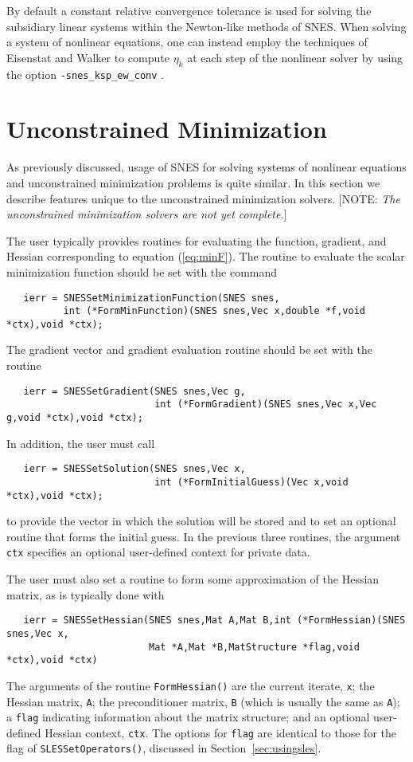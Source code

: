 By default a constant relative convergence tolerance is used for
solving the subsidiary linear systems within the Newton-like methods
of SNES.  When solving a system of nonlinear equations, one can
instead employ the techniques of Eisenstat and Walker \cite{ew94} to
compute $\eta_k$ at each step of the nonlinear solver by using the
option {\tt -snes\_ksp\_ew\_conv} .
 
\section{Unconstrained Minimization}
\label{sec:sums}

As previously discussed, usage of SNES for solving systems of nonlinear
equations and unconstrained minimization problems is quite similar.  In
this section we describe features unique to the unconstrained minimization
solvers. [NOTE:  {\em The unconstrained minimization solvers are not yet 
complete.}]

The user typically provides routines for evaluating the function,
gradient, and Hessian corresponding to equation (\ref{eq:minF}).  The
routine to evaluate the scalar minimization function should be set
with the command
\begin{verbatim}
   ierr = SNESSetMinimizationFunction(SNES snes,
          int (*FormMinFunction)(SNES snes,Vec x,double *f,void *ctx),void *ctx);
\end{verbatim}
The gradient vector and gradient evaluation routine should be set with
the routine
\begin{verbatim}
   ierr = SNESSetGradient(SNES snes,Vec g,
                          int (*FormGradient)(SNES snes,Vec x,Vec g,void *ctx),void *ctx);
\end{verbatim}
In addition, the user must call
\begin{verbatim}
   ierr = SNESSetSolution(SNES snes,Vec x,
                          int (*FormInitialGuess)(Vec x,void *ctx),void *ctx);
\end{verbatim}
to  provide the vector in which the solution
will be stored and to set an optional routine that forms the initial guess.
In the previous three routines, the argument {\tt ctx} specifies an 
optional user-defined context for private data.

The user must also set a routine to form
some approximation of the Hessian matrix, as is 
typically done with
\begin{verbatim}
   ierr = SNESSetHessian(SNES snes,Mat A,Mat B,int (*FormHessian)(SNES snes,Vec x,
                         Mat *A,Mat *B,MatStructure *flag,void *ctx),void *ctx)
\end{verbatim}
The  arguments of the routine
{\tt FormHessian()} are the current iterate, {\tt x}; the Hessian 
matrix, {\tt A}; the preconditioner matrix, {\tt B} (which is usually
the same as {\tt A}); a {\tt flag} indicating information about the matrix
structure; and an optional user-defined Hessian context, {\tt ctx}.
The options for {\tt flag} are identical to those for the flag of
{\tt SLESSetOperators()}, discussed in Section~\ref{sec:usingsles}.

